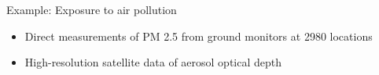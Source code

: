 \documentclass[t]{beamer}
\begin{document}
\begin{frame}

  {\Large\color{navyblue} Example: Exposure to air pollution}

  \begin{itemize}
  \item Direct measurements of PM 2.5 from ground monitors at 2980
    locations
  \item High-resolution satellite data of aerosol optical depth
    
  \end{itemize}
  \begin{center}
\end{center}
\end{frame}
\end{document}
